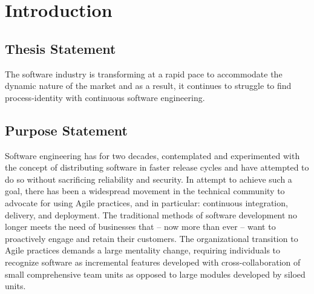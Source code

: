 \documentclass[11pt,a4paper]{article}
\begin{document}

\newpage

\section{Introduction}

\subsection{Thesis Statement}
The software industry is transforming at a rapid pace to accommodate the dynamic nature of the market and as a result, it continues to struggle to find process-identity with continuous software engineering.

\subsection{Purpose Statement}
Software engineering has for two decades, contemplated and experimented with the concept of distributing software in faster release cycles and have attempted to do so without sacrificing reliability and security. In attempt to achieve such a goal, there has been a widespread movement in the technical community to advocate for using Agile practices, and in particular: continuous integration, delivery, and deployment. The traditional methods of software development no longer meets the need of businesses that -- now more than ever -- want to proactively engage and retain their customers. The organizational transition to Agile practices demands a large mentality change, requiring individuals to recognize software as incremental features developed with cross-collaboration of small comprehensive team units as opposed to large modules developed by siloed units.
\end{document}
